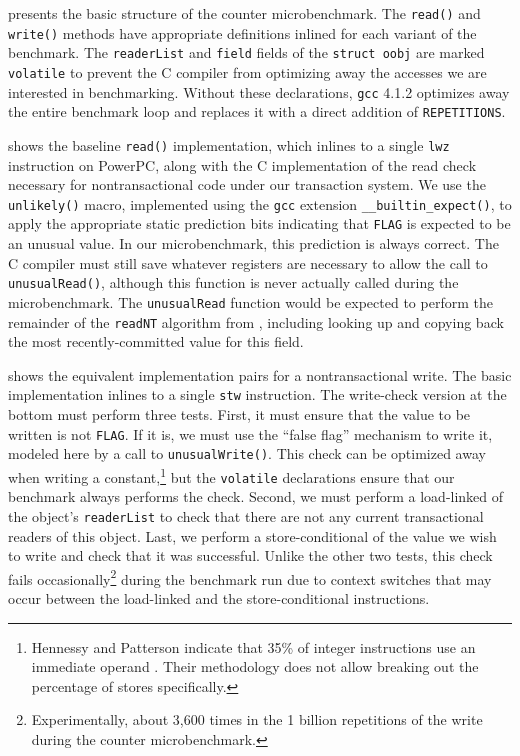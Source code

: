  presents the basic structure of the counter
microbenchmark. The \texttt{read()} and \texttt{write()} methods
have appropriate definitions inlined for each variant of the
benchmark.  The \texttt{readerList} and \texttt{field}
fields of the \texttt{struct oobj} are marked \texttt{volatile} to
prevent the C compiler from optimizing away the accesses we are
interested in benchmarking.  Without these declarations, \texttt{gcc}
4.1.2 optimizes away the entire benchmark loop and replaces it with
a direct addition of \texttt{REPETITIONS}.

 shows the baseline \texttt{read()}
implementation, which inlines to a single \texttt{lwz} instruction on
PowerPC, along with the C implementation of the read check necessary
for nontransactional code under our transaction system.  We use 
the \texttt{unlikely()} macro, implemented using the
\texttt{gcc} extension \texttt{\_\_builtin\_expect()}, to apply the
appropriate static prediction bits indicating that \texttt{FLAG} is
expected to be an unusual value.  In our microbenchmark, this
prediction is always correct.  The C compiler must still save
whatever registers are necessary to allow the call to
\texttt{unusualRead()}, although this function is never actually called
during the microbenchmark.  The \texttt{unusualRead} function would be
expected to perform the remainder of the \texttt{readNT} algorithm
from , including looking up and copying back the most
recently-committed value for this field.

 shows the equivalent implementation pairs for a
nontransactional write.  The basic implementation inlines to a single
\texttt{stw} instruction.  The write-check version at the bottom must
perform three tests.  First, it must ensure that the value to be
written is not \texttt{FLAG}.  If it is, we must use the ``false flag''
mechanism to write it, modeled here by a call to
\texttt{unusualWrite()}.  This check can be optimized away when
writing a constant,\footnote{Hennessy and Patterson indicate that 35\%
  of integer instructions use an immediate operand \cite[p. 78]{HennessyPa96}.
  Their methodology does not
  allow breaking out the percentage of stores specifically.}
 but the \texttt{volatile} declarations ensure that
our benchmark always performs the check.  Second, we must perform
a load-linked of the object's \texttt{readerList} to check that there
are not any current transactional readers of this object.  Last, we
perform a store-conditional of the value we wish to write and check
that it was successful.  Unlike the other two tests, this check
fails occasionally\footnote{Experimentally, about 3,600 times in
  the 1 billion repetitions of the write during the counter microbenchmark.}
 during the benchmark run due to context switches
that may occur between the load-linked and the store-conditional
instructions.

